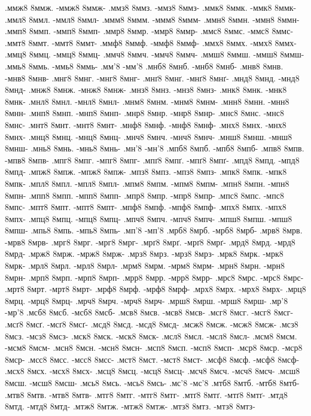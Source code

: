 {.ммж8 8ммж. -ммж8 8ммж-
.ммз8 8ммз. -ммз8 8ммз-
.ммк8 8ммк. -ммк8 8ммк-
.ммл8 8ммл. -ммл8 8ммл-
.ммм8 8ммм. -ммм8 8ммм-
.ммн8 8ммн. -ммн8 8ммн-
.ммп8 8ммп. -ммп8 8ммп-
.ммр8 8ммр. -ммр8 8ммр-
.ммс8 8ммс. -ммс8 8ммс-
.ммт8 8ммт. -ммт8 8ммт-
.ммф8 8ммф. -ммф8 8ммф-
.ммх8 8ммх. -ммх8 8ммх-
.ммц8 8ммц. -ммц8 8ммц-
.ммч8 8ммч. -ммч8 8ммч-
.ммш8 8ммш. -ммш8 8ммш-
.ммь8 8ммь. -ммь8 8ммь-
.мм'8 -мм'8
.мнб8 8мнб. -мнб8 8мнб-
.мнв8 8мнв. -мнв8 8мнв-
.мнг8 8мнг. -мнг8 8мнг-
.мнґ8 8мнґ. -мнґ8 8мнґ-
.мнд8 8мнд. -мнд8 8мнд-
.мнж8 8мнж. -мнж8 8мнж-
.мнз8 8мнз. -мнз8 8мнз-
.мнк8 8мнк. -мнк8 8мнк-
.мнл8 8мнл. -мнл8 8мнл-
.мнм8 8мнм. -мнм8 8мнм-
.мнн8 8мнн. -мнн8 8мнн-
.мнп8 8мнп. -мнп8 8мнп-
.мнр8 8мнр. -мнр8 8мнр-
.мнс8 8мнс. -мнс8 8мнс-
.мнт8 8мнт. -мнт8 8мнт-
.мнф8 8мнф. -мнф8 8мнф-
.мнх8 8мнх. -мнх8 8мнх-
.мнц8 8мнц. -мнц8 8мнц-
.мнч8 8мнч. -мнч8 8мнч-
.мнш8 8мнш. -мнш8 8мнш-
.мнь8 8мнь. -мнь8 8мнь-
.мн'8 -мн'8
.мпб8 8мпб. -мпб8 8мпб-
.мпв8 8мпв. -мпв8 8мпв-
.мпг8 8мпг. -мпг8 8мпг-
.мпґ8 8мпґ. -мпґ8 8мпґ-
.мпд8 8мпд. -мпд8 8мпд-
.мпж8 8мпж. -мпж8 8мпж-
.мпз8 8мпз. -мпз8 8мпз-
.мпк8 8мпк. -мпк8 8мпк-
.мпл8 8мпл. -мпл8 8мпл-
.мпм8 8мпм. -мпм8 8мпм-
.мпн8 8мпн. -мпн8 8мпн-
.мпп8 8мпп. -мпп8 8мпп-
.мпр8 8мпр. -мпр8 8мпр-
.мпс8 8мпс. -мпс8 8мпс-
.мпт8 8мпт. -мпт8 8мпт-
.мпф8 8мпф. -мпф8 8мпф-
.мпх8 8мпх. -мпх8 8мпх-
.мпц8 8мпц. -мпц8 8мпц-
.мпч8 8мпч. -мпч8 8мпч-
.мпш8 8мпш. -мпш8 8мпш-
.мпь8 8мпь. -мпь8 8мпь-
.мп'8 -мп'8
.мрб8 8мрб. -мрб8 8мрб-
.мрв8 8мрв. -мрв8 8мрв-
.мрг8 8мрг. -мрг8 8мрг-
.мрґ8 8мрґ. -мрґ8 8мрґ-
.мрд8 8мрд. -мрд8 8мрд-
.мрж8 8мрж. -мрж8 8мрж-
.мрз8 8мрз. -мрз8 8мрз-
.мрк8 8мрк. -мрк8 8мрк-
.мрл8 8мрл. -мрл8 8мрл-
.мрм8 8мрм. -мрм8 8мрм-
.мрн8 8мрн. -мрн8 8мрн-
.мрп8 8мрп. -мрп8 8мрп-
.мрр8 8мрр. -мрр8 8мрр-
.мрс8 8мрс. -мрс8 8мрс-
.мрт8 8мрт. -мрт8 8мрт-
.мрф8 8мрф. -мрф8 8мрф-
.мрх8 8мрх. -мрх8 8мрх-
.мрц8 8мрц. -мрц8 8мрц-
.мрч8 8мрч. -мрч8 8мрч-
.мрш8 8мрш. -мрш8 8мрш-
.мр'8 -мр'8
.мсб8 8мсб. -мсб8 8мсб-
.мсв8 8мсв. -мсв8 8мсв-
.мсг8 8мсг. -мсг8 8мсг-
.мсґ8 8мсґ. -мсґ8 8мсґ-
.мсд8 8мсд. -мсд8 8мсд-
.мсж8 8мсж. -мсж8 8мсж-
.мсз8 8мсз. -мсз8 8мсз-
.мск8 8мск. -мск8 8мск-
.мсл8 8мсл. -мсл8 8мсл-
.мсм8 8мсм. -мсм8 8мсм-
.мсн8 8мсн. -мсн8 8мсн-
.мсп8 8мсп. -мсп8 8мсп-
.мср8 8мср. -мср8 8мср-
.мсс8 8мсс. -мсс8 8мсс-
.мст8 8мст. -мст8 8мст-
.мсф8 8мсф. -мсф8 8мсф-
.мсх8 8мсх. -мсх8 8мсх-
.мсц8 8мсц. -мсц8 8мсц-
.мсч8 8мсч. -мсч8 8мсч-
.мсш8 8мсш. -мсш8 8мсш-
.мсь8 8мсь. -мсь8 8мсь-
.мс'8 -мс'8
.мтб8 8мтб. -мтб8 8мтб-
.мтв8 8мтв. -мтв8 8мтв-
.мтг8 8мтг. -мтг8 8мтг-
.мтґ8 8мтґ. -мтґ8 8мтґ-
.мтд8 8мтд. -мтд8 8мтд-
.мтж8 8мтж. -мтж8 8мтж-
.мтз8 8мтз. -мтз8 8мтз-
}
